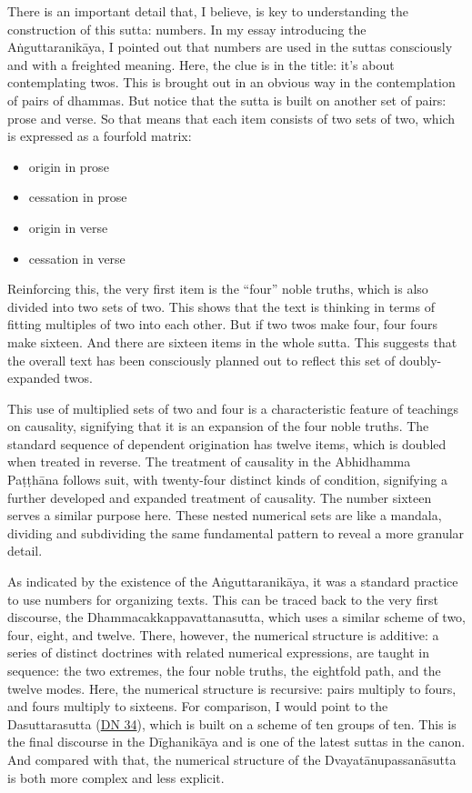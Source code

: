 \documentclass[12pt,openany]{book}%
\begin{document}
There is an important detail that, I believe, is key to understanding the construction of this sutta: numbers. In my essay introducing the \textsanskrit{Aṅguttaranikāya}, I pointed out that numbers are used in the suttas consciously and with a freighted meaning. Here, the clue is in the title: it’s about contemplating twos. This is brought out in an obvious way in the contemplation of pairs of dhammas. But notice that the sutta is built on another set of pairs: prose and verse. So that means that each item consists of two sets of two, which is expressed as a fourfold matrix:

\begin{itemize}%
\item origin in prose%
\item cessation in prose%
\item origin in verse%
\item cessation in verse%
\end{itemize}

Reinforcing this, the very first item is the “four” noble truths, which is also divided into two sets of two. This shows that the text is thinking in terms of fitting multiples of two into each other. But if two twos make four, four fours make sixteen. And there are sixteen items in the whole sutta. This suggests that the overall text has been consciously planned out to reflect this set of doubly-expanded twos.

This use of multiplied sets of two and four is a characteristic feature of teachings on causality, signifying that it is an expansion of the four noble truths. The standard sequence of dependent origination has twelve items, which is doubled when treated in reverse. The treatment of causality in the Abhidhamma \textsanskrit{Paṭṭhāna} follows suit, with twenty-four distinct kinds of condition, signifying a further developed and expanded treatment of causality. The number sixteen serves a similar purpose here. These nested numerical sets are like a mandala, dividing and subdividing the same fundamental pattern to reveal a more granular detail.

As indicated by the existence of the \textsanskrit{Aṅguttaranikāya}, it was a standard practice to use numbers for organizing texts. This can be traced back to the very first discourse, the Dhammacakkappavattanasutta, which uses a similar scheme of two, four, eight, and twelve. There, however, the numerical structure is additive: a series of distinct doctrines with related numerical expressions, are taught in sequence: the two extremes, the four noble truths, the eightfold path, and the twelve modes. Here, the numerical structure is recursive: pairs multiply to fours, and fours multiply to sixteens. For comparison, I would point to the Dasuttarasutta (\href{https://suttacentral.net/dn34/en/sujato}{DN 34}), which is built on a scheme of ten groups of ten. This is the final discourse in the \textsanskrit{Dīghanikāya} and is one of the latest suttas in the canon. And compared with that, the numerical structure of the \textsanskrit{Dvayatānupassanāsutta} is both more complex and less explicit.
\end{document}
